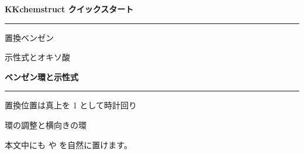 \documentclass[a4paper,11pt]{ltjsarticle}
\newcommand{\pagetitle}[1]{%
  \begin{center}
    {\sffamily\bfseries\Large\color{qaccentDark}#1}\par
    \vspace{1mm}
    {\color{qaccent}\rule{.72\linewidth}{.7pt}}
  \end{center}
  \vspace{5mm}}
\begin{document}
\pagetitle{KKchemstruct クイックスタート}

\begin{ExamplePanel}{置換ベンゼン}
  \begin{center}
    \hspace{5em}
  \end{center}
\end{ExamplePanel}

\vspace{5mm}

\begin{ExamplePanel}{示性式とオキソ酸}
  \begin{center}
    \hspace{4em}
    \hspace{4em}
  \end{center}
\end{ExamplePanel}

\vspace{5mm}
\begin{center}
  \small\ttfamily
  \string\KKsalicylicacid\qquad
  \string\KKglycerol\qquad
  \string\KKsulfuricacid
\end{center}

\newpage

\pagetitle{ベンゼン環と示性式}

\begin{ExamplePanel}{置換位置は真上を 1 として時計回り}
  \begin{center}
    \hspace{4em}
    \hspace{4em}
  \end{center}
\end{ExamplePanel}

\vspace{5mm}

\begin{ExamplePanel}{環の調整と横向きの環}
  \begin{center}
    \hspace{5em}
  \end{center}

  \medskip
  本文中にも \KKphenylring{} や  を自然に置けます。
\end{ExamplePanel}
\end{document}
